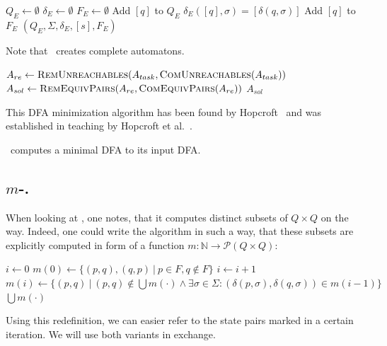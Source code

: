 \begin{enumerate}
	\vspace{0.2cm}
	\begin{algorithmic}[1] \label{ch:1:minmerge}
		 
            \State $Q_E \gets \emptyset$
            \State $\delta_E \gets \emptyset$
            \State $F_E \gets \emptyset$
                \State Add $[q]$ to $Q_E$
                    \State $\delta_E([q], \sigma) = [\delta(q, \sigma)]$
                \EndFor
                    \State Add $[q]$ to $F_E$
                \EndIf
            \EndFor
			\State \Return $(Q_E, \Sigma, \delta_E, [s], F_E)$
		\EndFunction
	\end{algorithmic}
	Note that \RemEq\ creates complete automatons.
\end{enumerate}

\vspace{0.2cm}
\begin{algorithmic}[1] \label{ch:1:minalg}
    \State $A_{re} \gets \textsc{RemUnreachables}(A_{task}, \textsc{ComUnreachables}(A_{task}))$
    \State $A_{sol} \gets \textsc{RemEquivPairs}(A_{re}, \textsc{ComEquivPairs}(A_{re}))$
    \State \Return $A_{sol}$
    \EndFunction
\end{algorithmic}
\vspace{0.2cm}
\noindent This DFA minimization algorithm has been found by Hopcroft~\cite{Hop71} and was established in teaching by Hopcroft et al.~\cite[pp. 154-164]{HMU01}.

\begin{theorem}\label{ch:1:min-alg-correct}\textnormal{\cite[pp. 162-164]{HMU01}}
	\MinAlg\ computes a minimal DFA to its input DFA.
\end{theorem}

\subsection{$m$-\CompDist.}

When looking at \CompDist, one notes, that it computes distinct subsets of $Q \times Q$ on the way. Indeed, one could write the algorithm in such a way, that these subsets are explicitly computed in form of a function $m\colon\mathbb{N}\to\mathcal{P}(Q\times Q)$:
\vspace{0.2cm}
\begin{algorithmic}[1] \label{ch:1:m-minmark}
	\State $i \gets 0$
	\State $m(0) \gets \{ (p,q), (q,p)\ |\ p \in F, q \notin F \}$
	\Do
		\State $i \gets i + 1$
		\State $m(i) \gets \{ (p,q)\ |\ (p,q) \notin \bigcup{m(\cdot)} \land \exists \sigma \in \Sigma \colon (\delta(p,\sigma), \delta(q,\sigma)) \in m(i-1) \}$
	\State \Return $\bigcup{m(\cdot)}$
	\EndFunction
\end{algorithmic}
\vspace{0.2cm}
Using this redefinition, we can easier refer to the state pairs marked in a certain iteration. We will use both variants in exchange.

